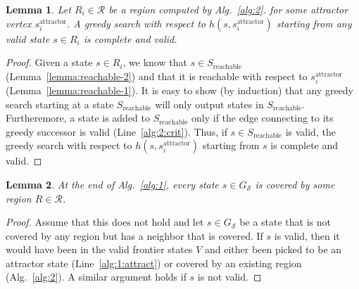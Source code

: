 \documentclass[letterpaper]{article} %
\newcommand{\calS}{\ensuremath{\mathcal{S}}\xspace}
\newcommand{\calR}{\ensuremath{\mathcal{R}}\xspace}
\newcommand{\sAttract}{\ensuremath{s^{\text{attractor}}_i}\xspace}
\newtheorem{lemma}{Lemma}
\begin{document}
\begin{lemma}
\label{lemma:greedy}
Let $R_i \in \calR$ be a region computed by Alg.~\ref{alg:2}.
for some attractor vertex \sAttract.
% 
A greedy search with respect to $h(s, \sAttract)$  starting from any valid state $s \in R_i$ is complete and valid.
\end{lemma}

\begin{proof}
Given a state $s \in R_i$, we know that $s \in S_{\text{reachable}}$ (Lemma~\ref{lemma:reachable-2})
and that it is reachable with respect to \sAttract (Lemma~\ref{lemma:reachable-1}).
%
It is easy to show (by induction) that any greedy search starting at a state $S_{\text{reachable}}$ will only output states in $S_{\text{reachable}}$.
Furtheremore, a state is added to $S_{\text{reachable}}$ only if the edge connecting to its greedy successor is valid (Line~\ref{alg:2:crit}).
Thus, if $s\in S_{\text{reachable}}$ is valid, the greedy search with respect to $h(s, \sAttract)$  starting from $s$ is complete and valid.
\end{proof}

\begin{lemma}
\label{lemma:coverage}
At the end of Alg.~\ref{alg:1}, every state $s \in G_\calS$ is covered by some region $R \in \calR$.
\end{lemma}
\begin{proof}
Assume that this does not hold and let $s \in G_\calS$ be a state that is not covered by any region but has a neighbor that is covered.
%
If $s$ is valid, then it would have been in the valid frontier states $V$ and either been picked to be an attractor state (Line~\ref{alg:1:attract}) or covered by an existing region (Alg.~\ref{alg:2}).
%
A similar argument holds if $s$ is not valid.
\end{proof}


%
\end{document}
